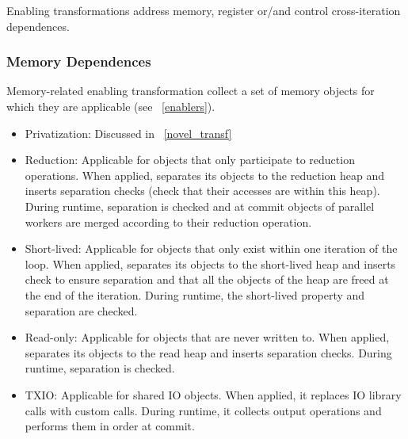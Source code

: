 Enabling transformations address memory, register or/and control
cross-iteration dependences.

\subsubsection{Memory Dependences}

Memory-related enabling transformation collect a set of memory objects
for which they are applicable (see ~\ref{enablers}).


\begin{itemize}
%
\item Privatization: Discussed in ~\ref{novel_transf}

\item Reduction: Applicable for objects that only participate to
reduction operations. When applied, separates its objects to the
reduction heap and inserts separation checks (check that their
accesses are within this heap). During runtime, separation is checked
and at commit objects of parallel workers are
merged according to their reduction operation.




\item Short-lived: Applicable for objects that only exist within one
iteration of the loop. When applied, separates its objects to the
short-lived heap and inserts check to ensure separation and that all
the objects of the heap are freed at the end of the iteration. During
runtime, the short-lived property and separation are checked.

\item Read-only: Applicable for objects that are never written to.
When applied, separates its objects to the read heap and inserts
separation checks.  During runtime, separation is checked.

\item TXIO: Applicable for shared IO objects. When applied, it
replaces IO library calls with custom calls. During runtime, it
collects output operations and performs them in order at commit.

\end{itemize}

